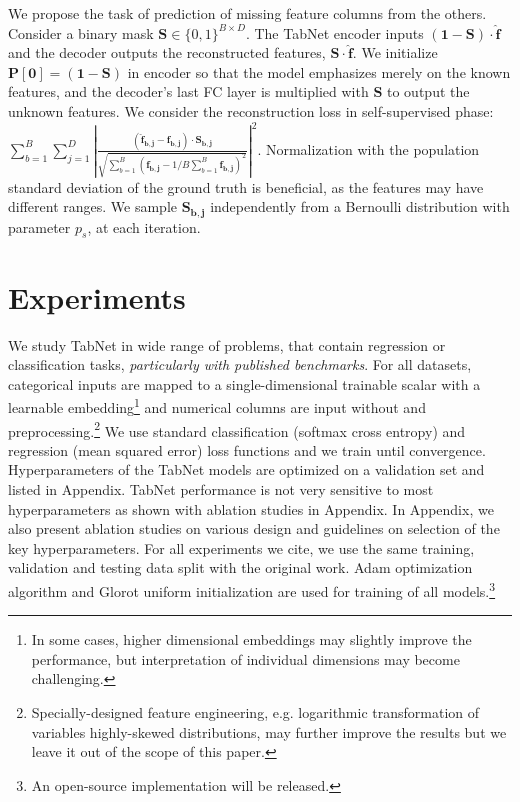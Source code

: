 We propose the task of prediction of missing feature columns from the others. Consider a binary mask $\mathbf{S} \in \{ 0, 1 \} ^ {B \times D}$.  
The TabNet encoder inputs $(\mathbf{1} - \mathbf{S}) \cdot \mathbf{\hat{f}}$ and the decoder outputs the reconstructed features, $\mathbf{S} \cdot \mathbf{\hat{f}}$. 
We initialize $\mathbf{P[0]} = (\mathbf{1} - \mathbf{S})$ in encoder so that the model emphasizes merely on the known features, and the decoder's last FC layer is multiplied with $\mathbf{S}$ to output the unknown features. 
We consider the reconstruction loss in self-supervised phase:
$\sum_{b=1}^{B} \sum_{j=1}^{D} \left | 
\frac{ ({\mathbf{\hat{f}_{b,j}}} - \mathbf{f_{b,j}}) \cdot \mathbf{\mathbf{S_{b,j}}}}
{\sqrt{\sum_{b=1}^{B} (\mathbf{f_{b,j}} - {1/B} \sum_{b=1}^{B} \mathbf{f_{b,j}})^{2}}}
\right | ^2.
$
Normalization with the population standard deviation of the ground truth is beneficial, as the features may have different ranges. We sample $\mathbf{S_{b,j}}$ independently from a Bernoulli distribution with parameter $p_s$, at each iteration. 

\section{Experiments}
\vspace{0cm}

We study TabNet in wide range of problems, that contain regression or classification tasks, \emph{particularly with published benchmarks}. 
For all datasets, categorical inputs are mapped to a single-dimensional trainable scalar with a learnable embedding\footnote{In some cases, higher dimensional embeddings may slightly improve the performance, but interpretation of individual dimensions may become challenging.} and numerical columns are input without and preprocessing.\footnote{Specially-designed feature engineering, e.g. logarithmic transformation of variables highly-skewed distributions, may further improve the results but we leave it out of the scope of this paper.}
We use standard classification (softmax cross entropy) and regression (mean squared error) loss functions and we train until convergence. Hyperparameters of the TabNet models are optimized on a validation set and listed in Appendix. TabNet performance is not very sensitive to most hyperparameters as shown with ablation studies in Appendix. In Appendix, we also present ablation studies on various design and guidelines on selection of the key hyperparameters.
For all experiments we cite, we use the same training, validation and testing data split with the original work. Adam optimization algorithm \citep{adam} and Glorot uniform initialization are used for training of all models.\footnote{An open-source implementation will be released.}

